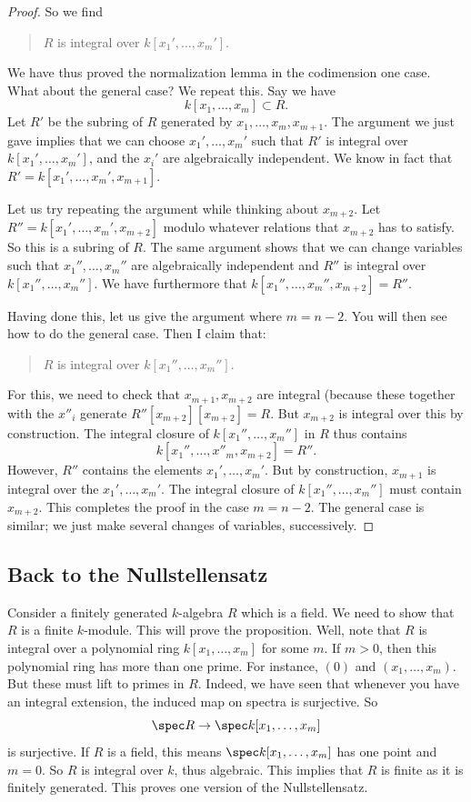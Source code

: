 \begin{proof}
So we find
\begin{quote}
$R$ is integral over $k[x_1', \dots, x_m']$.
\end{quote}

We have thus proved the normalization lemma in the codimension one case. What
about the general case? We repeat this.
Say we have
\[ k[x_1, \dots, x_m] \subset R.  \]
Let $R'$ be the subring of $R$ generated by $x_{1}, \dots,x_m, x_{m+1}$. The
argument we just gave implies that we can choose $x_1', \dots, x_m'$ such that
$R'$ is integral over $k[x_1', \dots, x_m']$, and the $x_i'$ are
algebraically independent.
We know in fact that $R' = k[x_1', \dots, x_m', x_{m+1}]$.

Let us try repeating the argument while thinking about $x_{m+2}$. Let $R'' =
k[x_1', \dots, x_m', x_{m+2}]$ modulo whatever relations that $x_{m+2}$ has to
satisfy. So this is a subring of $R$. The same argument shows that we can
change variables such that $x_1'', \dots, x_m''$ are algebraically independent
and $R''$ is integral over $k[x_1'', \dots, x_m'']$. We have furthermore that
$k[x_1'', \dots, x_m'', x_{m+2}] = R''$.

Having done this, let us give the argument where $m=n-2$. You will then see
how to do the general case. Then I claim that:
\begin{quote}
$R$ is integral over $k[x_1'', \dots, x_m'']$.
\end{quote}
For this, we need to check that $x_{m+1}, x_{m+2}$ are integral (because these
together with the $x''_i$ generate $R''[x_{m+2}][x_{m+2}]=R$.
But $x_{m+2}$ is integral over this by construction. The integral closure of
$k[x_1'', \dots, x_{m}'']$ in $R$ thus contains
\[ k[x_1'', \dots, x''_m, x_{m+2}] = R''.  \]
However, $R''$ contains the elements $x_1', \dots, x_m'$. But by construction,
$x_{m+1}$ is integral over the $x_1', \dots, x_m'$. The integral closure of
$k[x_1'', \dots, x_{m}'']$ must contain $x_{m+2}$. This completes the proof in
the case $m=n-2$. The general case is similar; we just make several changes of
variables, successively.

\end{proof}
\subsection{Back to the Nullstellensatz}

Consider a finitely generated $k$-algebra $R$ which is a field. We need to
show that $R$ is a
finite $k$-module. This will prove the proposition.
Well, note that $R$ is integral over a polynomial ring $k[x_1, \dots, x_m]$ for
some $m$.
If $m > 0$, then this polynomial ring has more than one prime.
For instance, $(0)$ and $(x_1, \dots, x_m)$. But these must lift to primes in
$R$. Indeed, we have seen that whenever you have an integral extension, the
induced map on spectra is surjective. So
\[ \spec R \to \spec k[x_1, \dots, x_m]  \]
is surjective. If $R$ is a field, this means $\spec k[x_1, \dots, x_m]$ has one
point and $m=0$. So $R$ is integral over $k$, thus algebraic. This implies that
$R$ is finite as it is finitely generated. This proves one version of the
Nullstellensatz.


